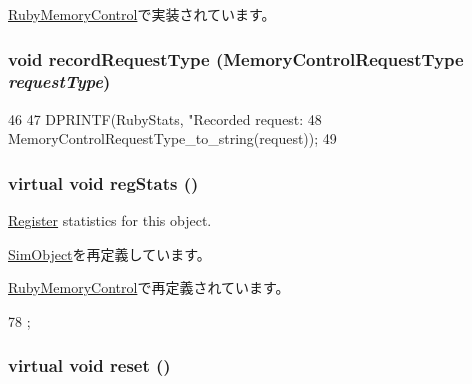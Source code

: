 \hyperlink{classRubyMemoryControl_ac55fe386a101fbae38c716067c9966a0}{RubyMemoryControl}で実装されています。\hypertarget{classMemoryControl_a8dec08568d22323e381f2e55d4ced403}{
\subsubsection[{recordRequestType}]{\setlength{\rightskip}{0pt plus 5cm}void recordRequestType (MemoryControlRequestType {\em requestType})}}
\label{classMemoryControl_a8dec08568d22323e381f2e55d4ced403}



\begin{DoxyCode}
46                                                                  {
47     DPRINTF(RubyStats, "Recorded request: %
48             MemoryControlRequestType_to_string(request));
49 }
\end{DoxyCode}
\hypertarget{classMemoryControl_ac1739a9be0fbd5d96cf441cd3b2c1c78}{
\subsubsection[{regStats}]{\setlength{\rightskip}{0pt plus 5cm}virtual void regStats ()}}
\label{classMemoryControl_ac1739a9be0fbd5d96cf441cd3b2c1c78}
\hyperlink{classRegister}{Register} statistics for this object. 

\hyperlink{classSimObject_a4dc637449366fcdfc4e764cdf12d9b11}{SimObject}を再定義しています。

\hyperlink{classRubyMemoryControl_a4dc637449366fcdfc4e764cdf12d9b11}{RubyMemoryControl}で再定義されています。


\begin{DoxyCode}
78 {};
\end{DoxyCode}
\hypertarget{classMemoryControl_a20dcbdfbd0ec77afc802522bb7e379c1}{
\subsubsection[{reset}]{\setlength{\rightskip}{0pt plus 5cm}virtual void reset ()}}
\label{classMemoryControl_a20dcbdfbd0ec77afc802522bb7e379c1}


